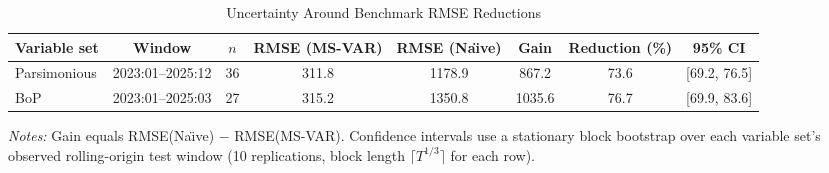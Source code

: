 \begin{table}[htbp]
\centering
\footnotesize
\caption{Uncertainty Around Benchmark RMSE Reductions}
\label{tab:headline_rmse_uncertainty}
\begin{tabular}{lccccccc}
\toprule
Variable set & Window & $n$ & RMSE (MS-VAR) & RMSE (Na\"{\i}ve) & Gain & Reduction (\%) & 95\% CI \\
\midrule
Parsimonious & 2023:01--2025:12 & 36 & 311.8 & 1178.9 & 867.2 & 73.6 & [69.2, 76.5] \\
BoP & 2023:01--2025:03 & 27 & 315.2 & 1350.8 & 1035.6 & 76.7 & [69.9, 83.6] \\
\bottomrule
\end{tabular}
\begin{tablenotes}
\footnotesize
\item \textit{Notes:} Gain equals RMSE(Na\"{\i}ve) $-$ RMSE(MS-VAR). Confidence intervals use a stationary block bootstrap over each variable set's observed rolling-origin test window (10 replications, block length $\lceil T^{1/3} \rceil$ for each row).
\end{tablenotes}
\end{table}
